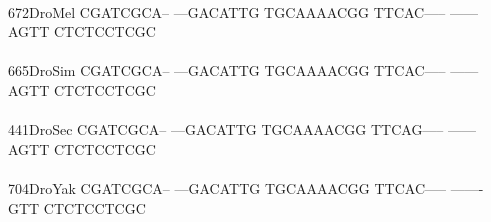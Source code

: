 \documentclass[11pt,twoside,reqno,a4paper]{article}
\begin{document}
{\\
672\hspace*{2\charwidth}DroMel	CGATCGCA--	---GACATTG	TGCAAAACGG	TTCAC-----	------AGTT	CTCTCCTCGC	\\
\hspace*{5\charwidth}\hspace*{7\charwidth}\hspace*{1\charwidth}\hspace*{1\charwidth}\hspace*{1\charwidth}\hspace*{1\charwidth}\hspace*{1\charwidth}\hspace*{1\charwidth}\\
665\hspace*{2\charwidth}DroSim	CGATCGCA--	---GACATTG	TGCAAAACGG	TTCAC-----	------AGTT	CTCTCCTCGC	\\
\hspace*{5\charwidth}\hspace*{7\charwidth}\hspace*{1\charwidth}\hspace*{1\charwidth}\hspace*{1\charwidth}\hspace*{1\charwidth}\hspace*{1\charwidth}\hspace*{1\charwidth}\\
441\hspace*{2\charwidth}DroSec	CGATCGCA--	---GACATTG	TGCAAAACGG	TTCAG-----	------AGTT	CTCTCCTCGC	\\
\hspace*{5\charwidth}\hspace*{7\charwidth}\hspace*{1\charwidth}\hspace*{1\charwidth}\hspace*{1\charwidth}\hspace*{1\charwidth}\hspace*{1\charwidth}\hspace*{1\charwidth}\\
704\hspace*{2\charwidth}DroYak	CGATCGCA--	---GACATTG	TGCAAAACGG	TTCAC-----	-------GTT	CTCTCCTCGC	\\
\hspace*{5\charwidth}\hspace*{7\charwidth}\hspace*{1\charwidth}\hspace*{1\charwidth}\hspace*{1\charwidth}\hspace*{1\charwidth}\hspace*{1\charwidth}\hspace*{1\charwidth}\\
}
\end{document}
